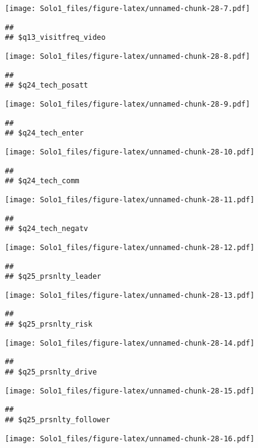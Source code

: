 \documentclass[]{article}
\begin{document}
\texttt{[image: Solo1\_files/figure-latex/unnamed-chunk-28-7.pdf]}

\begin{verbatim}
## 
## $q13_visitfreq_video
\end{verbatim}

\texttt{[image: Solo1\_files/figure-latex/unnamed-chunk-28-8.pdf]}

\begin{verbatim}
## 
## $q24_tech_posatt
\end{verbatim}

\texttt{[image: Solo1\_files/figure-latex/unnamed-chunk-28-9.pdf]}

\begin{verbatim}
## 
## $q24_tech_enter
\end{verbatim}

\texttt{[image: Solo1\_files/figure-latex/unnamed-chunk-28-10.pdf]}

\begin{verbatim}
## 
## $q24_tech_comm
\end{verbatim}

\texttt{[image: Solo1\_files/figure-latex/unnamed-chunk-28-11.pdf]}

\begin{verbatim}
## 
## $q24_tech_negatv
\end{verbatim}

\texttt{[image: Solo1\_files/figure-latex/unnamed-chunk-28-12.pdf]}

\begin{verbatim}
## 
## $q25_prsnlty_leader
\end{verbatim}

\texttt{[image: Solo1\_files/figure-latex/unnamed-chunk-28-13.pdf]}

\begin{verbatim}
## 
## $q25_prsnlty_risk
\end{verbatim}

\texttt{[image: Solo1\_files/figure-latex/unnamed-chunk-28-14.pdf]}

\begin{verbatim}
## 
## $q25_prsnlty_drive
\end{verbatim}

\texttt{[image: Solo1\_files/figure-latex/unnamed-chunk-28-15.pdf]}

\begin{verbatim}
## 
## $q25_prsnlty_follower
\end{verbatim}

\texttt{[image: Solo1\_files/figure-latex/unnamed-chunk-28-16.pdf]}
\end{document}
